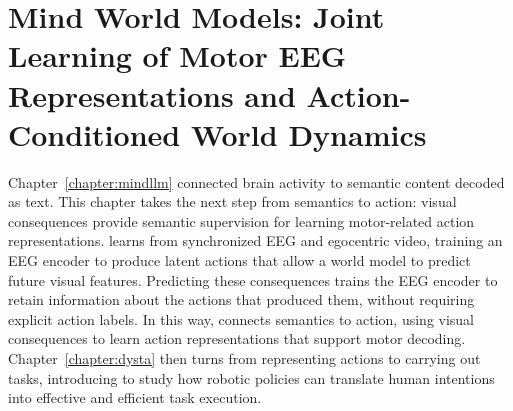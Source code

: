 \chapter{Mind World Models: Joint Learning of Motor EEG Representations and Action-Conditioned World Dynamics}
\label{chapter:mwm}

Chapter~\ref{chapter:mindllm} connected brain activity to semantic content decoded as text. This chapter takes the next step from semantics to action: visual consequences provide semantic supervision for learning motor-related action representations. \mwm{} learns from synchronized EEG and egocentric video, training an EEG encoder to produce latent actions that allow a world model to predict future visual features. Predicting these consequences trains the EEG encoder to retain information about the actions that produced them, without requiring explicit action labels. In this way, \mwm{} connects semantics to action, using visual consequences to learn action representations that support motor decoding. Chapter~\ref{chapter:dysta} then turns from representing actions to carrying out tasks, introducing \dysta{} to study how robotic policies can translate human intentions into effective and efficient task execution.






